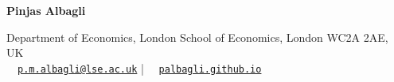 \documentclass[letterpaper, 12pt]{article}
\begin{document}
	
	
	\thispagestyle{first}
	\begin{center}
		\LARGE
		\textbf{Pinjas Albagli}
	\end{center}
	
	\begin{center}
		\small
		Department of Economics, London School of Economics, London WC2A 2AE, UK
		\\[.5ex]
		\textcolor{stlavender}{\faEnvelopeO}~~\href{mailto:p.m.albagli@lse.ac.uk}{\texttt{p.m.albagli@lse.ac.uk}}
		|
		\textcolor{stlavender}{\faLaptop}~~\href{https://palbagli.github.io}{\texttt{palbagli.github.io}}
	\end{center}
	\smallskip


	
	
	
	\bigskip\medskip
		
	
	
	
	\bigskip\medskip
	
	
	
	
	\bigskip\medskip
	
	
	
	
	\bigskip\medskip
	
	
	
	
	\bigskip\medskip
	
	
	
	
	\bigskip\medskip
	
	
	
	
	\bigskip\medskip
	
	
	
	
	\bigskip\medskip
	
	
	
	
	

	\thispagestyle{last}
\end{document}
